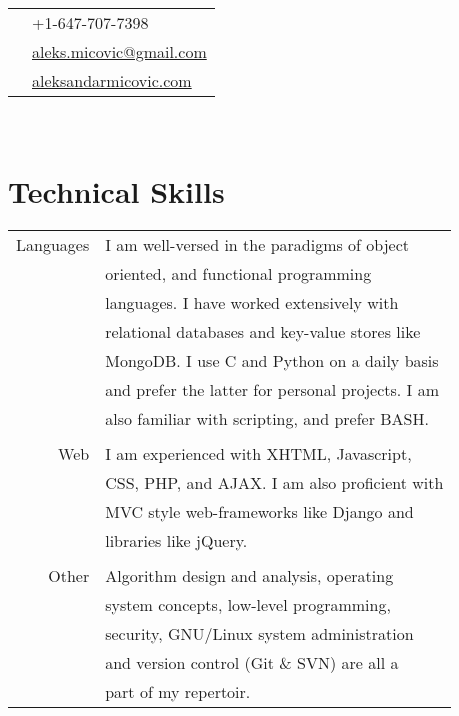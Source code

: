 \documentclass[10pt]{article}
\begin{document}
\begin{minipage}[t]{0.44\textwidth}

    \vspace{0pt}
	
\colorbox{shade}{\textcolor{text1}{
    \begin{tabular}{c|p{7cm}}
        \raisebox{-3pt}{\Phone}
        &+1-647-707-7398\\
        \raisebox{-3pt}{\Envelope}
        &\href{mailto:aleks.micovic@gmail.com}{aleks.micovic@gmail.com}\\
		\raisebox{-3pt}{\PencilRightDown}
		&\href{http://aleksandarmicovic.com}{aleksandarmicovic.com}
	\end{tabular}}}\\[10pt]

\section{Technical Skills}
    \begin{tabular}{rl}
    Languages &  I am well-versed in the paradigms of object\\
              &  oriented, and functional programming\\
              &  languages. I have worked extensively with\\
              &  relational databases and key-value stores like\\
              &  MongoDB. I use C and Python on a daily basis\\
              &  and prefer the latter for personal projects. I am\\ 
              &  also familiar with scripting, and prefer BASH.\\ 
              \\
	Web   &  I am experienced with XHTML, Javascript,\\
              &  CSS, PHP, and AJAX. I am also proficient with\\ 
              &  MVC style web-frameworks like Django and\\
              &  libraries like jQuery.\\
              \\
    Other     &  Algorithm design and analysis, operating\\
              &  system concepts, low-level programming, \\
              &  security, GNU/Linux system administration\\
              &  and version control (Git \& SVN) are all a\\ 
              &  part of my repertoir.\\
    \end{tabular}\\[10pt]


\end{minipage}
\end{document}
